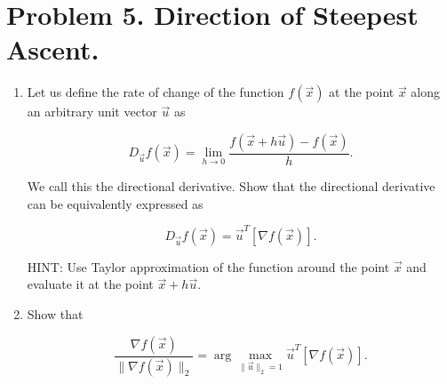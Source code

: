 \documentclass[
  12pt,
]{fphw}
\begin{document}
\section*{Problem 5. Direction of Steepest Ascent.}
\begin{enumerate}

\item[(a)] Let us define the rate of change of the function $f(\vec{x})$ at the point $\vec{x}$ along an arbitrary unit vector $\vec{u}$ as

\[
D_{\vec{u}} f(\vec{x}) =
\lim_{h \to 0}
\frac{f(\vec{x} + h\vec{u}) - f(\vec{x})}{h}.
\]

We call this the directional derivative. Show that the directional derivative can be equivalently expressed as

\[
D_{\vec{u}} f(\vec{x}) = \vec{u}^T [\nabla f(\vec{x})].
\]

HINT: Use Taylor approximation of the function around the point $\vec{x}$ and evaluate it at the point $\vec{x} + h\vec{u}$.

\item[(b)] Show that

\[
\frac{\nabla f(\vec{x})}{\|\nabla f(\vec{x})\|_2}
=
\arg\max_{\|\vec{u}\|_2 = 1}
\vec{u}^T [\nabla f(\vec{x})].
\]

\end{enumerate}
\end{document}
